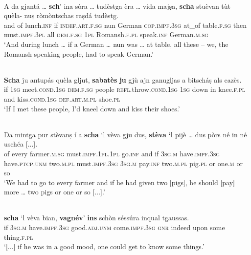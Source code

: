 \ea
\label{ex:cond2}
\\ 
\gll    A da gjantá … \textbf{sch}’ ina sòra … tudèstga èra … vida majṣa, \textbf{scha} stuèvan tùt quèla- nuṣ ròmòntschas raṣdá tudèstg.\\
and of lunch.\textsc{inf} {} if \textsc{indef.art.f.sg} nun {} German \textsc{cop.impf.3sg} {} at\_of table.\textsc{f.sg} then must.\textsc{impf.3pl} all \textsc{dem.f.sg} \textsc{1pl} Romansh.\textsc{f.pl} speak.\textsc{inf} German.\textsc{m.sg}\\
\glt `And during lunch … if a German … nun was … at table, all these – we, the Romansh speaking people, had to speak German.'
\z

\ea
\label{ex:cond3}
\\
\gll \textbf{Scha} ju antupás quèla gljut, \textbf{sabatès} \textbf{ju} gjù ajn ganugljas a bitscháṣ als cazès.\\
if \textsc{1sg} meet.\textsc{cond.1sg} \textsc{dem.f.sg} people \textsc{refl}.throw.\textsc{cond.1sg} \textsc{1sg} down in knee.\textsc{f.pl} and kiss.\textsc{cond.1sg} \textsc{def.art.m.pl} shoe.\textsc{pl}\\
\glt `If I met these people, I’d kneel down and kiss their shoes.'
\z

\ea
\label{ex:cond4}
\\ 
\gll Da mintga pur stèvanṣ í a \textbf{scha} `l vèva gju dus, \textbf{stèva} \textbf{`l} pijè …  dus pòrs né in né uschéa [...].\\
of every farmer.\textsc{m.sg} must.\textsc{impf.1pl.1pl} go.\textsc{inf} and if \textsc{3sg.m} have.\textsc{impf.3sg} have.\textsc{ptcp.unm} two.\textsc{m.pl} must.\textsc{impf.3sg}  \textsc{3sg.m} pay.\textsc{inf} {} two.\textsc{m.pl} pig.\textsc{pl} or one.\textsc{m} or so\\
\glt `We had to go to every farmer and if he had given two [pigs], he should [pay] more … two pigs or one or so [...].'
\z


\ea
\label{ex:cond5}
\\ 
\gll  [...] \textbf{scha} `l vèva bian, \textbf{vagnév}’ \textbf{ins} schòn séssúra inqual tgaussas.\\
{} if \textsc{3sg.m}  have.\textsc{impf.3sg} good.\textsc{adj.unm} come.\textsc{impf.3sg} \textsc{gnr} indeed upon some thing.\textsc{f.pl} \\
\glt `[...] if he was in a good mood, one could get to know some things.'
\z

